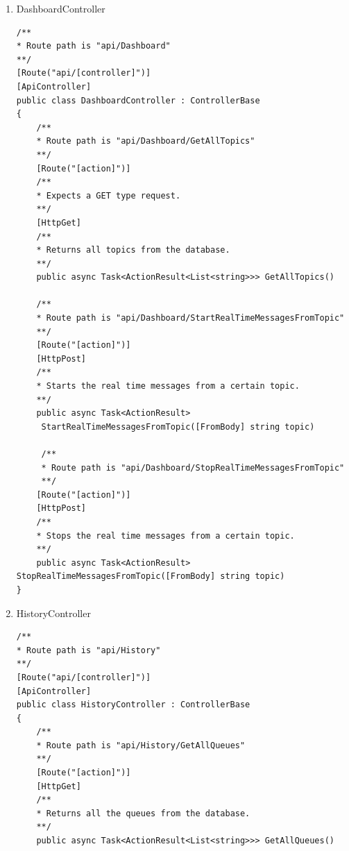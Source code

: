 \begin{enumerate}
\begin{lstlisting}
	/**
	* Route path is "api/Container/ListSchedulerRules"
	**/
	[Route("[action]")]
	[HttpPost]
	/**
	* Returns all scheduler rules.
	**/
	public async Task<ActionResult<List<SchedulerRule>>> ListSchedulerRules([FromBody] string ruleNamePrefix)
	
	/**
	* Route path is "api/Container/DeleteSchedulerRule"
	**/
	[Route("[action]")]
	[HttpPost]
	/**
	* Deletes a scheduler rule.
	**/
	public async Task<ActionResult> DeleteSchedulerRule([FromBody] string ruleName)
	}
	
	/**
	* Route path is "api/Container/EnableSchedulerRule"
	**/
	[Route("[action]")]
	[HttpPost]
	/**
	* Enables a scheduler rule.
	**/
	public async Task<ActionResult> EnableSchedulerRule([FromBody] string ruleName)
	
	/**
	* Route path is "api/Container/DisableSchedulerRule"
	**/
	[Route("[action]")]
	[HttpPost]
	/**
	* Disables a scheduler rule.
	**/
	public async Task<ActionResult> DisableSchedulerRule([FromBody] string ruleName)
}
\end{lstlisting}

	\item DashboardController

\begin{lstlisting}
/**
* Route path is "api/Dashboard"
**/
[Route("api/[controller]")]
[ApiController]
public class DashboardController : ControllerBase
{
	/**
	* Route path is "api/Dashboard/GetAllTopics"
	**/
	[Route("[action]")]
	/**
	* Expects a GET type request.
	**/
	[HttpGet]
	/**
	* Returns all topics from the database.
	**/
	public async Task<ActionResult<List<string>>> GetAllTopics()
	
	/**
	* Route path is "api/Dashboard/StartRealTimeMessagesFromTopic"
	**/
	[Route("[action]")]
	[HttpPost]
	/**
	* Starts the real time messages from a certain topic.
	**/
	public async Task<ActionResult>
	 StartRealTimeMessagesFromTopic([FromBody] string topic)
	 
	 /**
	 * Route path is "api/Dashboard/StopRealTimeMessagesFromTopic"
	 **/
	[Route("[action]")]
	[HttpPost]
	/**
	* Stops the real time messages from a certain topic.
	**/
	public async Task<ActionResult> StopRealTimeMessagesFromTopic([FromBody] string topic)
}
\end{lstlisting}

	\item HistoryController

\begin{lstlisting}
/**
* Route path is "api/History"
**/
[Route("api/[controller]")]
[ApiController]
public class HistoryController : ControllerBase
{
	/**
	* Route path is "api/History/GetAllQueues"
	**/
	[Route("[action]")]
	[HttpGet]
	/**
	* Returns all the queues from the database.
	**/
	public async Task<ActionResult<List<string>>> GetAllQueues()
	

\end{lstlisting}
\end{enumerate}
